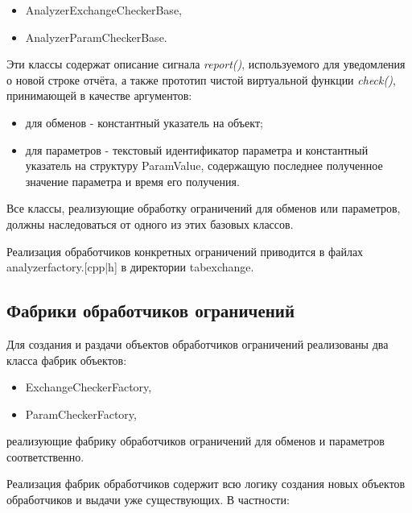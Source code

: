 \begin{itemize}
 \item AnalyzerExchangeCheckerBase,
 \item AnalyzerParamCheckerBase.
\end{itemize}

Эти классы содержат описание сигнала \textit{report()}, используемого для 
уведомления о новой строке отчёта, а также прототип чистой виртуальной функции 
\textit{check()}, принимающей в качестве аргументов:

\begin{itemize}
 \item для обменов - константный указатель на объект;
 \item для параметров - текстовый идентификатор параметра и константный 
указатель на структуру ParamValue, содержащую последнее полученное значение 
параметра и время его получения.
\end{itemize}

Все классы, реализующие обработку ограничений для обменов или параметров, 
должны наследоваться от одного из этих базовых классов.

Реализация обработчиков конкретных ограничений приводится в файлах 
analyzerfactory.[cpp|h] в директории tabexchange.

\subsection*{Фабрики обработчиков ограничений}

Для создания и раздачи объектов обработчиков ограничений реализованы два класса 
фабрик объектов:

\begin{itemize}
 \item ExchangeCheckerFactory,
 \item ParamCheckerFactory,
\end{itemize}

реализующие фабрику обработчиков ограничений для обменов и параметров 
соответственно.

Реализация фабрик обработчиков содержит всю логику создания новых объектов 
обработчиков и выдачи уже существующих. В частности:

